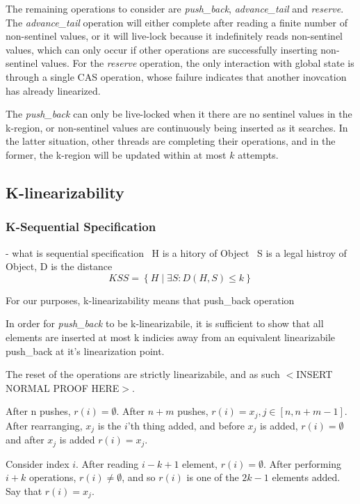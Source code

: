 \documentclass{sigplanconf}
\begin{document}
The remaining operations to consider are \emph{push\_back}, \emph{advance\_tail} and \emph{reserve}.
The \emph{advance\_tail} operation will either complete after reading a finite number of non-sentinel values, or it will live-lock because it indefinitely reads non-sentinel values, which can only occur if other operations are successfully inserting non-sentinel values. For the \emph{reserve} operation, the only interaction with global state is through a single CAS operation, whose failure indicates that another inovcation has already linearized.

The \emph{push\_back} can only be live-locked when it there are no sentinel values in the k-region, or non-sentinel values are continuously being inserted as it searches. In the latter situation, other threads are completing their operations, and in the former, the k-region will be updated within at most $k$ attempts.

\subsection{K-linearizability}

\subsubsection{K-Sequential Specification}

- what is sequential specification
\
H is a hitory of Object
\
S is a legal histroy of Object, D is the distance
$$ KSS = \left\{ H \middle\vert \exists S : D\left(H, S\right) \le k \right\} $$

For our purposes, k-linearizability means that push\_back operation

In order for \emph{push\_back} to be k-linearizabile, it is sufficient to show that all elements are inserted at most k indicies away from an equivalent linearizabile push\_back at it's linearization point.

The reset of the operations are strictly linearizabile, and as such $<$INSERT NORMAL PROOF HERE$>$.

After n pushes, $r(i) = \emptyset$. After $n+m$ pushes, $r(i) = x_j, j \in [n, n+m-1]$. After rearranging, $x_j$ is the $i$'th thing added, and before $x_j$ is added, $r(i)=\emptyset$ and after $x_j$ is added $r(i)=x_j$.

Consider index $i$. After reading $i-k+1$ element, $r(i) = \emptyset$. After performing $i + k$  operations, $r(i) \ne \emptyset$, and so $r(i)$ is one of the $2k-1$ elements added. Say that $r(i)=x_j$.
\end{document}
